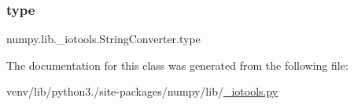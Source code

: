 \mbox{\label{classnumpy_1_1lib_1_1__iotools_1_1StringConverter_a384ac106a689255808139a75b14bf28f}} 
\subsubsection{\texorpdfstring{type}{type}}
{\footnotesize\ttfamily numpy.\+lib.\+\_\+iotools.\+String\+Converter.\+type}



The documentation for this class was generated from the following file\+:\begin{DoxyCompactItemize}
\item 
venv/lib/python3./site-\/packages/numpy/lib/\hyperlink{__iotools_8py}{\+\_\+iotools.\+py}\end{DoxyCompactItemize}
